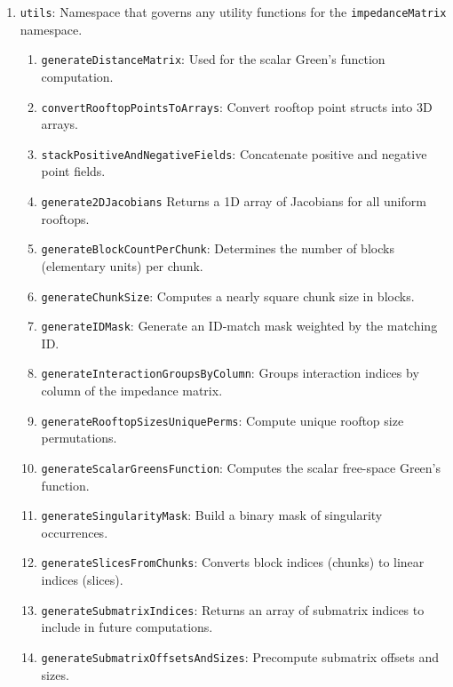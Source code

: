 \documentclass[9pt]{article}
\begin{document}
\begin{enumerate}[label=\Roman*.]
        \begin{enumerate}[label=\roman*.]
            \item \texttt{constructor}
            \item \texttt{generateFull}
            \item \texttt{generateSpecified}
            \item \texttt{generateImpl\_}: Uses the static generateChunk method of \texttt{MagneticPartAssembler} and \texttt{ElectricPartAssembler} to compute the impedance matrix with less memory requirements that separate calculations of the magnetic and electric parts.
            \item \texttt{generateSingularityContext}
        \end{enumerate}
        \item \texttt{utils}: Namespace that governs any utility functions for the \texttt{impedanceMatrix} namespace.
        \begin{enumerate}[label=\roman*.]
            \item \texttt{generateDistanceMatrix}: Used for the scalar Green's function computation.
            \item \texttt{convertRooftopPointsToArrays}: Convert rooftop point structs into 3D arrays.
            \item \texttt{stackPositiveAndNegativeFields}: Concatenate positive and negative point fields.
            \item \texttt{generate2DJacobians} Returns a 1D array of Jacobians for all uniform rooftops.
            \item \texttt{generateBlockCountPerChunk}: Determines the number of blocks (elementary units) per chunk.
            \item \texttt{generateChunkSize}: Computes a nearly square chunk size in blocks.
            \item \texttt{generateIDMask}: Generate an ID‑match mask weighted by the matching ID.
            \item \texttt{generateInteractionGroupsByColumn}: Groups interaction indices by column of the impedance matrix.
            \item \texttt{generateRooftopSizesUniquePerms}: Compute unique rooftop size permutations.
            \item \texttt{generateScalarGreensFunction}: Computes the scalar free-space Green's function.
            \item \texttt{generateSingularityMask}: Build a binary mask of singularity occurrences.
            \item \texttt{generateSlicesFromChunks}: Converts block indices (chunks) to linear indices (slices).
            \item \texttt{generateSubmatrixIndices}: Returns an array of submatrix indices to include in future computations.
            \item \texttt{generateSubmatrixOffsetsAndSizes}: Precompute submatrix offsets and sizes.
        \end{enumerate}
    \end{enumerate}
\end{document}
